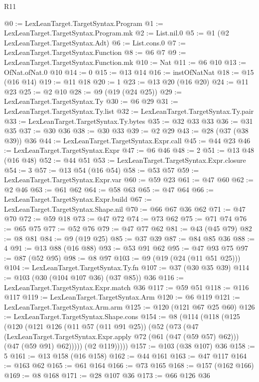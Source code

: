 \begin{lexlean}{R11}
\begin{coremodule}
{{{{{{{{{{{{{@0 := LexLeanTarget.TargetSyntax.Program
@1 := LexLeanTarget.TargetSyntax.Program.mk
@2 := List.nil.{0}
@5 := @1 (@2 LexLeanTarget.TargetSyntax.Adt)
@6 := List.cons.{0}
@7 := LexLeanTarget.TargetSyntax.Function
@8 := @6 @7
@9 := LexLeanTarget.TargetSyntax.Function.mk
@10 := Nat
@11 := @6 @10
@13 := OfNat.ofNat.{0} @10
@14 := 0
@15 := @13 @14
@16 := instOfNatNat
@18 := @15 (@16 @14)
@19 := @11 @18
@20 := 1
@23 := @13 @20 (@16 @20)
@24 := @11 @23
@25 := @2 @10
@28 := @9 (@19 (@24 @25))
@29 := LexLeanTarget.TargetSyntax.Ty
@30 := @6 @29
@31 := LexLeanTarget.TargetSyntax.Ty.list
@32 := LexLeanTarget.TargetSyntax.Ty.pair
@33 := LexLeanTarget.TargetSyntax.Ty.bytes
@35 := @32 @33 @33
@36 := @31 @35
@37 := @30 @36
@38 := @30 @33
@39 := @2 @29
@43 := @28 (@37 (@38 @39)) @36
@44 := LexLeanTarget.TargetSyntax.Expr.call
@45 := @44 @23
@46 := LexLeanTarget.TargetSyntax.Expr
@47 := @6 @46
@48 := 2
@51 := @13 @48 (@16 @48)
@52 := @44 @51
@53 := LexLeanTarget.TargetSyntax.Expr.closure
@54 := 3
@57 := @13 @54 (@16 @54)
@58 := @53 @57
@59 := LexLeanTarget.TargetSyntax.Expr.var
@60 := @59 @23
@61 := @47 @60
@62 := @2 @46
@63 := @61 @62
@64 := @58 @63
@65 := @47 @64
@66 := LexLeanTarget.TargetSyntax.Expr.build
@67 := LexLeanTarget.TargetSyntax.Shape.nil
@70 := @66 @67 @36 @62
@71 := @47 @70
@72 := @59 @18
@73 := @47 @72
@74 := @73 @62
@75 := @71 @74
@76 := @65 @75
@77 := @52 @76
@79 := @47 @77 @62
@81 := @43 (@45 @79)
@82 := @8 @81
@84 := @9 (@19 @25)
@85 := @37 @39
@87 := @84 @85 @36
@88 := 4
@91 := @13 @88 (@16 @88)
@93 := @53 @91 @62
@95 := @47 @93 @75
@97 := @87 (@52 @95)
@98 := @8 @97
@103 := @9 (@19 (@24 (@11 @51 @25)))
@104 := LexLeanTarget.TargetSyntax.Ty.fn
@107 := @37 (@30 @35 @39)
@114 := @103 (@30 (@104 @107 @36) (@37 @85)) @36
@116 := LexLeanTarget.TargetSyntax.Expr.match @36
@117 := @59 @51
@118 := @116 @117
@119 := LexLeanTarget.TargetSyntax.Arm
@120 := @6 @119
@121 := LexLeanTarget.TargetSyntax.Arm.arm
@125 := @120 (@121 @67 @25 @60)
@126 := LexLeanTarget.TargetSyntax.Shape.cons
@154 := @8
    (@114
      (@118
        (@125
          (@120
            (@121
              @126
              (@11 @57 (@11 @91 @25))
              (@52
                (@73
                  (@47
                    (LexLeanTarget.TargetSyntax.Expr.apply @72 (@61 (@47 (@59 @57) @62)))
                    (@47 (@59 @91) @62)))))
            (@2 @119)))))
@157 := @103 (@38 @107) @36
@158 := 5
@161 := @13 @158 (@16 @158)
@162 := @44 @161
@163 := @47 @117
@164 := @163 @62
@165 := @61 @164
@166 := @73 @165
@168 := @157 (@162 @166)
@169 := @8 @168
@171 := @28 @107 @36
@173 := @66 @126 @36
}}}}}}}}}}}}}
\end{coremodule}
\end{lexlean}
